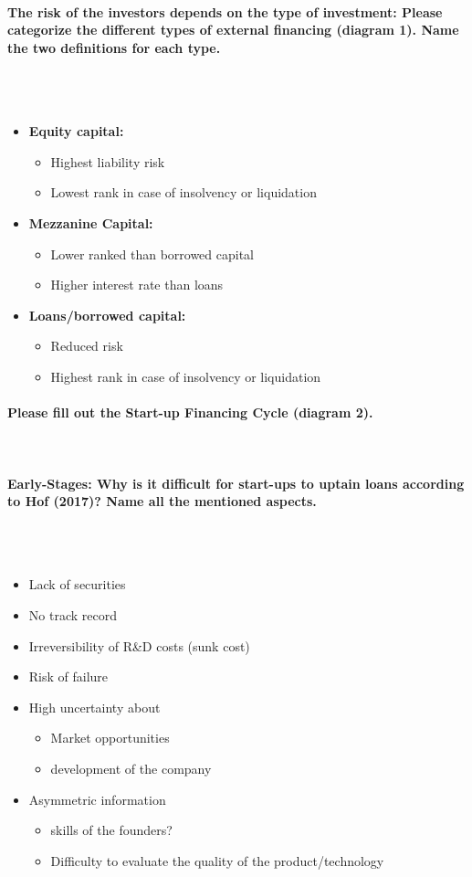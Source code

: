 \documentclass[10pt,a4paper,noendnumber=true]{scrartcl}
\newcommand{\properparagraph}[1]{\paragraph{\textcolor{Emerald}{#1}}\mbox{}\\}
\begin{document}
\properparagraph{The risk of the investors depends on the type of investment: Please categorize the different types of external financing (diagram 1). Name the two	definitions for each type.}
\\[-6ex]
\begin{itemize}
	\item \textbf{Equity capital:}
	\begin{itemize}
		\item Highest liability risk
		\item Lowest rank in case of insolvency or liquidation
	\end{itemize}
	\item \textbf{Mezzanine Capital:}
	\begin{itemize}
		\item Lower ranked than borrowed capital
		\item Higher interest rate than loans
	\end{itemize}
	\item \textbf{Loans/borrowed capital:}
	\begin{itemize}
		\item Reduced risk
		\item Highest rank in case of insolvency or liquidation
	\end{itemize}
\end{itemize}


\properparagraph{Please fill out the Start-up Financing Cycle (diagram 2).}

\properparagraph{Early-Stages: Why is it difficult for start-ups to uptain loans according to Hof (2017)? Name all the mentioned aspects.}
\\[-6ex]
\begin{itemize}
	\item Lack of securities
	\item No track record
	\item Irreversibility of R\&D costs (sunk cost)
	\item Risk of failure
	\item High uncertainty about
	\begin{itemize}
		\item Market opportunities
		\item development of the company
	\end{itemize}
	\item Asymmetric information
	\begin{itemize}
		\item skills of the founders?  
		\item Difficulty to evaluate the quality of the product/technology
	\end{itemize}
\end{itemize}
\end{document}
